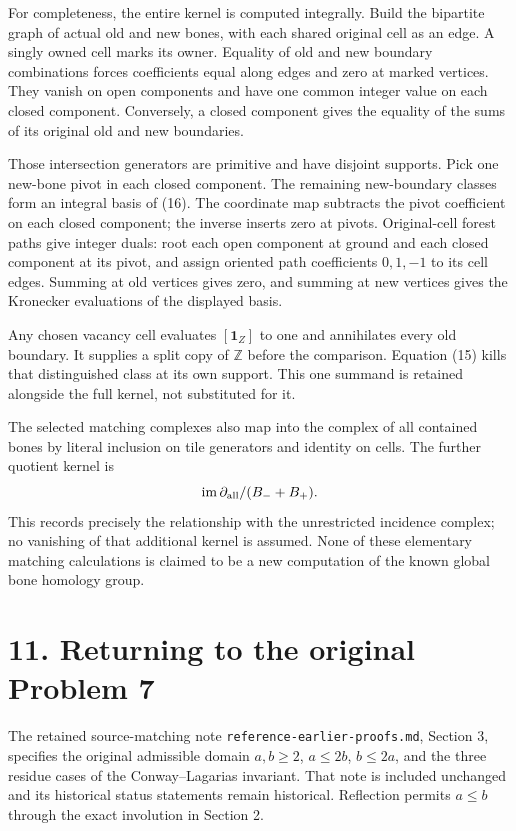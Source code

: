 \documentclass[
  11pt,
]{article}
\begin{document}
For completeness, the entire kernel is computed integrally. Build the
bipartite graph of actual old and new bones, with each shared original
cell as an edge. A singly owned cell marks its owner. Equality of old
and new boundary combinations forces coefficients equal along edges and
zero at marked vertices. They vanish on open components and have one
common integer value on each closed component. Conversely, a closed
component gives the equality of the sums of its original old and new
boundaries.

Those intersection generators are primitive and have disjoint supports.
Pick one new-bone pivot in each closed component. The remaining
new-boundary classes form an integral basis of (16). The coordinate map
subtracts the pivot coefficient on each closed component; the inverse
inserts zero at pivots. Original-cell forest paths give integer duals:
root each open component at ground and each closed component at its
pivot, and assign oriented path coefficients \(0,1,-1\) to its cell
edges. Summing at old vertices gives zero, and summing at new vertices
gives the Kronecker evaluations of the displayed basis.

Any chosen vacancy cell evaluates \([\mathbf1_Z]\) to one and
annihilates every old boundary. It supplies a split copy of
\(\mathbb Z\) before the comparison. Equation (15) kills that
distinguished class at its own support. This one summand is retained
alongside the full kernel, not substituted for it.

The selected matching complexes also map into the complex of all
contained bones by literal inclusion on tile generators and identity on
cells. The further quotient kernel is \[
 \operatorname{im}\partial_{\rm all}/(B_-+B_+).
\] This records precisely the relationship with the unrestricted
incidence complex; no vanishing of that additional kernel is assumed.
None of these elementary matching calculations is claimed to be a new
computation of the known global bone homology group.

\section{11. Returning to the original Problem
7}\label{returning-to-the-original-problem-7}

The retained source-matching note \texttt{reference-earlier-proofs.md},
Section 3, specifies the original admissible domain \(a,b\ge2\),
\(a\le2b\), \(b\le2a\), and the three residue cases of the
Conway--Lagarias invariant. That note is included unchanged and its
historical status statements remain historical. Reflection permits
\(a\le b\) through the exact involution in Section 2.
\end{document}
